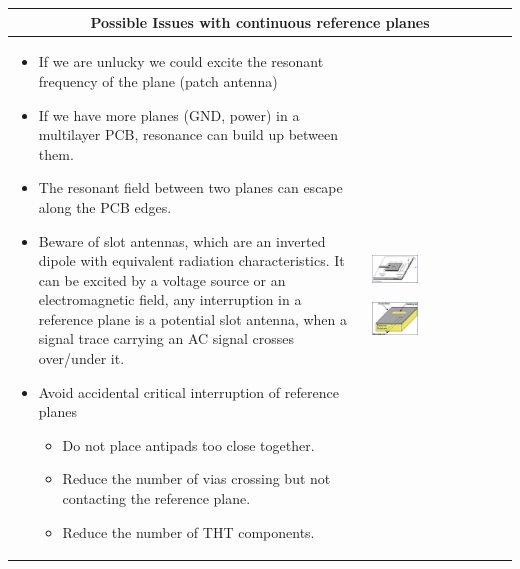 		\begin{table}[h!]
		\centering
		\begin{tabular}{|m{}|m{}|}
				\multicolumn{2}{c}{\textbf{Possible Issues with continuous reference planes}}
			\\
			\hline
				\begin{itemize}
					\item If we are unlucky we could excite the resonant frequency of the plane (patch antenna) 
					\item If we have more planes (GND, power) in a multilayer PCB, resonance can build up between them. 
					\item The resonant field between two planes can escape along the PCB edges. 
					\item Beware of slot antennas, which are an inverted dipole with equivalent radiation characteristics. It can be excited by a voltage source or an electromagnetic field, any interruption in a reference plane is a potential slot antenna, when a signal trace carrying an AC signal crosses over/under it. 
					\item Avoid accidental critical interruption of reference planes
					\begin{itemize}
						\item Do not place antipads too close together.
						\item Reduce the number of vias crossing but not contacting the reference plane. 
						\item Reduce the number of THT components. 
					\end{itemize}
				\end{itemize}
			& 
				 \begin{center}\includegraphics[width=0.35\textwidth]{images/Patchantenna.png}\end{center} 
				 \begin{center}\includegraphics[width=0.35\textwidth]{images/SlotAntenna.png}\end{center} 

\end{tabular}
\end{table}
